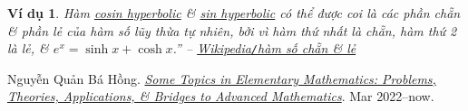 \documentclass[oneside]{book}
\numberwithin{equation}{section}
\newtheorem{vidu}{Ví dụ}[section]
\begin{document}
\begin{vidu}
	Hàm \href{https://vi.wikipedia.org/wiki/H%C3%A0m_hyperbolic}{cosin hyperbolic} \& \href{https://vi.wikipedia.org/wiki/H%C3%A0m_hyperbolic}{sin hyperbolic} có thể được coi là các phần chẵn \& phần lẻ của hàm số lũy thừa tự nhiên, bởi vì hàm thứ nhất là chẵn, hàm thứ 2 là lẻ, \& $e^x = \sinh x + \cosh x$.'' -- \href{https://vi.wikipedia.org/wiki/H%C3%A0m_s%E1%BB%91_ch%E1%BA%B5n_v%C3%A0_l%E1%BA%BB}{Wikipedia\emph{\texttt{/}}hàm số chẵn \& lẻ}
\end{vidu}


\begin{thebibliography}{99}
	 Nguyễn Quản Bá Hồng. \href{https://github.com/NQBH/hobby/blob/master/elementary_mathematics/some_topics_in_elementary_mathematics_problems_theories_applications_bridges_to_advanced_mathematics/NQBH_some_topics_in_elementary_mathematics_problems_theories_applications_bridges_to_advanced_mathematics.pdf}{\textit{Some Topics in Elementary Mathematics: Problems, Theories, Applications, \& Bridges to Advanced Mathematics}}. Mar 2022--now.
\end{thebibliography}


\printbibliography[heading=bibintoc]
	
\end{document}
